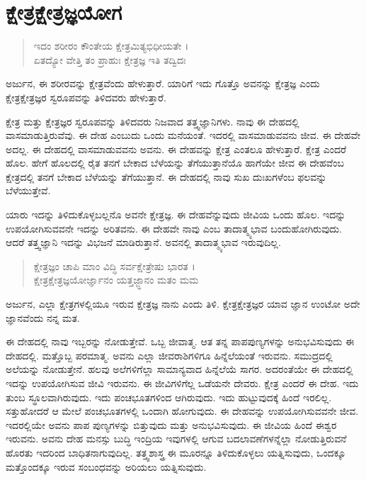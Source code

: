 
\chapter{ಕ್ಷೇತ್ರಕ್ಷೇತ್ರಜ್ಞಯೋಗ}

\begin{verse}
ಇದಂ ಶರೀರಂ ಕೌಂತೇಯ ಕ್ಷೇತ್ರಮಿತ್ಯಭಿಧೀಯತೇ ।\\ಏತದ್ಯೋ ವೇತ್ತಿ ತಂ ಪ್ರಾಹುಃ ಕ್ಷೇತ್ರಜ್ಞ ಇತಿ ತದ್ವಿದಃ 
\end{verse}

{\small ಅರ್ಜುನ, ಈ ಶರೀರವನ್ನು ಕ್ಷೇತ್ರವೆಂದು ಹೇಳುತ್ತಾರೆ. ಯಾರಿಗೆ ಇದು ಗೊತ್ತೊ ಅವನನ್ನು ಕ್ಷೇತ್ರಜ್ಞ ಎಂದು ಕ್ಷೇತ್ರಕ್ಷೇತ್ರಜ್ಞರ ಸ್ವರೂಪವನ್ನು ತಿಳಿದವರು ಹೇಳುತ್ತಾರೆ.}

ಕ್ಷೇತ್ರ ಮತ್ತು ಕ್ಷೇತ್ರಜ್ಞರ ಸ್ವರೂಪವನ್ನು ತಿಳಿದವರು ನಿಜವಾದ ತತ್ತ್ವಜ್ಞಾನಿಗಳು. ನಾವು ಈ ದೇಹದಲ್ಲಿ ವಾಸಮಾಡುತ್ತಿರುವೆವು. ಈ ದೇಹ ಎಂಬುದು ಒಂದು ಮನೆಯಂತೆ. ಇದರಲ್ಲಿ ವಾಸಮಾಡುವವನು ಜೀವ. ಈ ದೇಹವೇ ಅದಲ್ಲ. ಈ ದೇಹದಲ್ಲಿ ವಾಸಮಾಡುವವನು ಅವನು. ಈ ದೇಹವನ್ನು ಕ್ಷೇತ್ರ ಎಂತಲೂ ಹೇಳುತ್ತಾರೆ. ಕ್ಷೇತ್ರ ಎಂದರೆ ಹೊಲ. ಹೇಗೆ ಹೊಲದಲ್ಲಿ ರೈತ ತನಗೆ ಬೇಕಾದ ಬೆಳೆಯನ್ನು ತೆಗೆಯುತ್ತಾನೆಯೊ ಹಾಗೆಯೇ ಜೀವ ಈ ದೇಹವೆಂಬ ಕ್ಷೇತ್ರದಲ್ಲಿ ತನಗೆ ಬೇಕಾದ ಬೆಳೆಯನ್ನು ತೆಗೆಯುತ್ತಾನೆ. ಈ ದೇಹದಲ್ಲಿ ನಾವು ಸುಖ ದುಃಖಗಳೆಂಬ ಫಲವನ್ನು ಬೆಳೆಯುತ್ತೇವೆ.

ಯಾರು ಇದನ್ನು ತಿಳಿದುಕೊಳ್ಳಬಲ್ಲನೊ ಅವನೇ ಕ್ಷೇತ್ರಜ್ಞ. ಈ ದೇಹವೆನ್ನುವುದು ಜೀವಿಯ ಒಂದು ಹೊಲ. ಇದನ್ನು ಉಪಯೋಗಿಸುವವನೇ ಇದನ್ನು ಅರಿತವನು. ಈ ದೇಹವೇ ನಾವು ಎಂಬ ತಾದಾತ್ಮ್ಯಭಾವ ಬಂದುಹೋಗಿರುವುದು. ಆದರೆ ತತ್ತ್ವಜ್ಞಾನಿ ಇದನ್ನು ವಿಭಜನೆ ಮಾಡಿರುತ್ತಾನೆ. ಅವನಲ್ಲಿ ತಾದಾತ್ಮ್ಯಭಾವ ಇರುವುದಿಲ್ಲ.

\begin{verse}
ಕ್ಷೇತ್ರಜ್ಞಂ ಚಾಪಿ ಮಾಂ ವಿದ್ಧಿ ಸರ್ವಕ್ಷೇತ್ರೇಷು ಭಾರತ ।\\ಕ್ಷೇತ್ರಕ್ಷೇತ್ರಜ್ಞಯೋರ್ಜ್ಞಾನಂ ಯತ್ತಜ್ಜ್ಞಾನಂ ಮತಂ ಮಮ 
\end{verse}

{\small ಅರ್ಜುನ, ಎಲ್ಲಾ ಕ್ಷೇತ್ರಗಳಲ್ಲಿಯೂ ಇರುವ ಕ್ಷೇತ್ರಜ್ಞ ನಾನು ಎಂದು ತಿಳಿ. ಕ್ಷೇತ್ರಕ್ಷೇತ್ರಜ್ಞರ ಯಾವ ಜ್ಞಾನ ಉಂಟೋ ಅದೇ ಜ್ಞಾನವೆಂದು ನನ್ನ ಮತ.}

ಈ ದೇಹದಲ್ಲಿ ನಾವು ಇಬ್ಬರನ್ನು ನೋಡುತ್ತೇವೆ. ಒಬ್ಬ ಜೀವಾತ್ಮ. ಆತ ತನ್ನ ಪಾಪಪುಣ್ಯಗಳನ್ನು ಅನುಭವಿಸುವುದು ಈ ದೇಹದಲ್ಲಿ. ಮತ್ತೊಬ್ಬ ಪರಮಾತ್ಮ. ಅವನು ಎಲ್ಲಾ ಜೀವರಾಶಿಗಳಿಗೂ ಹಿನ್ನೆಲೆಯಂತೆ ಇರುವನು. ಸಮುದ್ರದಲ್ಲಿ ಅಲೆಯನ್ನು ನೋಡುತ್ತೇನೆ. ಹಲವು ಅಲೆಗಳಿಗೆಲ್ಲಾ ಸಾಮಾನ್ಯವಾದ ಹಿನ್ನೆಲೆಯೆ ಸಾಗರ. ಅದರಂತೆಯೇ ಈ ದೇಹದಲ್ಲಿ ಇದನ್ನು ಉಪಯೋಗಿಸುವ ಜೀವಿ ಇರುವನು. ಈ ಜೀವಿಗಳಿಗೆಲ್ಲ ಒಡೆಯನೇ ದೇವರು. ಕ್ಷೇತ್ರ ಎಂದರೆ ಈ ದೇಹ. ಇದು ತುಂಬ ಸ್ಥೂಲವಾಗಿರುವುದು. ಇದು ಪಂಚಭೂತಗಳಿಂದ ಆಗಿರುವುದು. ಇದು ಹುಟ್ಟುವುದಕ್ಕೆ ಹಿಂದೆ ಇರಲಿಲ್ಲ. ಸತ್ತುಹೋದರೆ ಆ ಮೇಲೆ ಪಂಚಭೂತಗಳಲ್ಲಿ ಒಂದಾಗಿ ಹೋಗುವುದು. ಈ ದೇಹವನ್ನು ಉಪಯೋಗಿಸುವವನೇ ಜೀವ. ಇದರಲ್ಲಿಯೇ ಅವನು ಪಾಪ ಪುಣ್ಯಗಳನ್ನು ಬಿತ್ತುವುದು ಮತ್ತು ಅನುಭವಿಸುವುದು. ಈ ಜೀವಿಯ ಹಿಂದೆ ಈಶ್ವರ ಇರುವನು. ಅವನು ದೇಹ ಮನಸ್ಸು ಬುದ್ಧಿ ಇಂದ್ರಿಯ ಇವುಗಳಲ್ಲಿ ಆಗುವ ಬದಲಾವಣೆಗಳನ್ನೆಲ್ಲಾ ನೋಡುತ್ತಿರುವನೆ ಹೊರತು ಇದರಿಂದ ಬಾಧಿತನಾಗುವುದಿಲ್ಲ. ತತ್ತ್ವಶಾಸ್ತ್ರ ಈ ಮೂರನ್ನೂ ತಿಳಿದುಕೊಳ್ಳಲು ಯತ್ನಿಸುವುದು, ಒಂದಕ್ಕೂ ಮತ್ತೊಂದಕ್ಕೂ ಇರುವ ಸಂಬಂಧವನ್ನು ಅರಿಯಲು ಯತ್ನಿಸುವುದು.

